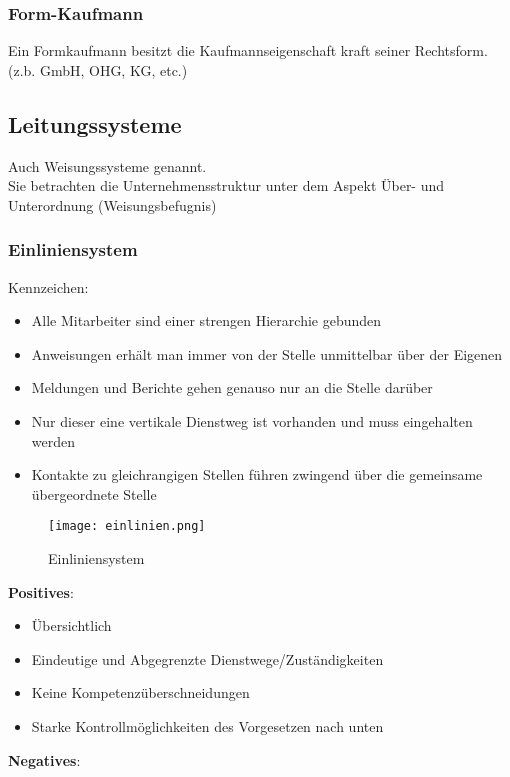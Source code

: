 \documentclass[asp1.tex]{subfiles}
\begin{document}
\subsubsection{Form-Kaufmann}
Ein Formkaufmann besitzt die Kaufmannseigenschaft kraft seiner Rechtsform. \\
(z.b. GmbH, OHG, KG, etc.)

\subsection{Leitungssysteme}
Auch Weisungssysteme genannt. \\
Sie betrachten die Unternehmensstruktur unter dem Aspekt \"Uber- und Unterordnung (Weisungsbefugnis)

\subsubsection{Einliniensystem}
Kennzeichen: \\
\begin{itemize}
    \item Alle Mitarbeiter sind einer strengen Hierarchie gebunden
    \item Anweisungen erhält man immer von der Stelle unmittelbar \"uber der Eigenen
    \item Meldungen und Berichte gehen genauso nur an die Stelle darüber
    \item Nur dieser eine vertikale Dienstweg ist vorhanden und muss eingehalten werden
    \item Kontakte zu gleichrangigen Stellen führen zwingend über die gemeinsame übergeordnete Stelle
\end{itemize}
\begin{figure}[H]
    \begin{center}
        \texttt{[image: einlinien.png]}
    \end{center}
    \caption{Einliniensystem}
    \label{fig:Einliniensystem}
\end{figure}
\textbf{Positives}:
\begin{itemize}
    \item \"Ubersichtlich
    \item Eindeutige und Abgegrenzte Dienstwege/Zust\"andigkeiten
    \item Keine Kompetenz\"uberschneidungen
    \item Starke Kontrollmöglichkeiten des Vorgesetzen nach unten
\end{itemize}
\textbf{Negatives}:
\end{document}
